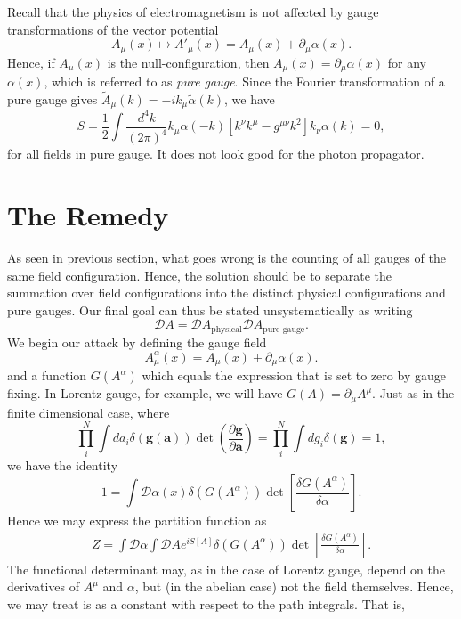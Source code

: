 \documentclass[twoside,utf8]{article}
\begin{document}
Recall that the physics of electromagnetism is not affected by gauge transformations of the vector potential
\[
A_\mu(x) \mapsto A'_\mu(x)=A_\mu(x)+\partial_\mu \alpha(x).
\]
Hence, if $A_\mu(x)$ is the null-configuration, then $A_\mu(x)=\partial_\mu \alpha(x)$ for any $\alpha(x)$, which is referred to as {\it pure gauge}. Since the Fourier transformation of a pure gauge gives $\tilde{A}_\mu(k) = -ik_\mu \tilde{\alpha}(k)$, we have
\[
S
= \frac{1}{2}\int \frac{d^4 k}{(2\pi)^4} k_\mu \alpha(-k) \left[
 k^\nu k^\mu - g^{\mu\nu} k^2
\right] k_\nu \alpha(k) = 0,
\]
for all fields in pure gauge. It does not look good for the photon propagator.





\section{The Remedy}
As seen in previous section, what goes wrong is the counting of all gauges of the same field configuration. Hence, the solution should be to separate the summation over field configurations into the distinct physical configurations and pure gauges. Our final goal can thus be stated unsystematically as writing
\[
\mathcal{D}A = \mathcal{D}A_{\text{physical}} \mathcal{D}A_{\text{pure gauge}}.
\]
We begin our attack by defining the gauge field
\[
A^\alpha_\mu(x)=A_\mu(x)+\partial_\mu \alpha(x).
\]
and a function $G(A^\alpha)$ which equals the expression that is set to zero by gauge fixing. In Lorentz gauge, for example, we will have $G(A)=\partial_\mu A^\mu$. Just as in the finite dimensional case, where
\[
\prod_i^N \int da_i \delta(\mathbf{g}(\mathbf{a}))\det \left(\frac{\partial \mathbf{g}}{\partial \mathbf{a}}\right)
= \prod_i^N \int dg_i \delta(\mathbf{g}) = 1,
\]
we have the identity
\[
1 = \int \mathcal{D}\alpha(x) \delta\left(G(A^\alpha)\right)\det \left[\frac{\delta G(A^\alpha)}{\delta \alpha}\right].
\]
Hence we may express the partition function as
\begin{equation*}
\begin{align}
Z = \int \mathcal{D}\alpha \int \mathcal{D}A e^{iS[A]} \delta\left(G(A^\alpha)\right)\det \left[\frac{\delta G(A^\alpha)}{\delta \alpha}\right].
\end{align}
\end{equation*}
The functional determinant may, as in the case of Lorentz gauge, depend on the derivatives of $A^\mu$ and $\alpha$, but (in the abelian case) not the field themselves. Hence, we may treat is as a constant with respect to the path integrals. That is,
\end{document}
